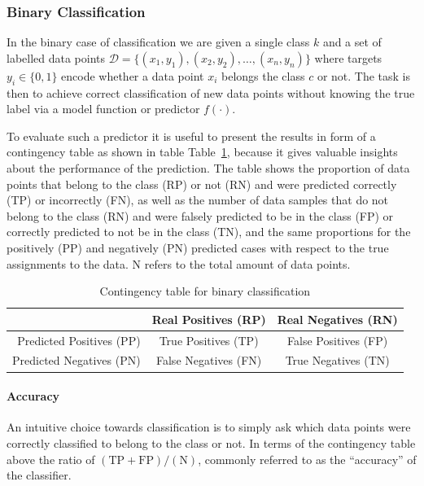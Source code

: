 \subsubsection*{Binary Classification}
\label{subs:Binary Classification}

In the binary case of classification we are given a single class $k$ and a set of labelled data points $\mathcal{D} = \{ (x_1, y_1), (x_2, y_2), \ldots, (x_n, y_n) \}$ where targets $y_i \in \{0, 1\}$ encode whether a data point $x_i$ belongs the class $c$ or not. The task is then to achieve correct classification of new data points without knowing the true label via a model function or predictor $f(\cdot)$.

To evaluate such a predictor it is useful to present the results in form of a contingency table as shown in table Table~\ref{table:contingency-table-2}, because it gives valuable insights about the performance of the prediction. The table shows the proportion of data points that belong to the class (RP) or not (RN) and were predicted correctly (TP) or incorrectly (FN), as well as the number of data samples that do not belong to the class (RN) and were falsely predicted to be in the class (FP) or correctly predicted to not be in the class (TN), and the same proportions for the positively (PP) and negatively (PN) predicted cases with respect to the true assignments to the data. N refers to the total amount of data points.

\begin{table}[h]
  \begin{center}
    \begin{tabular}{r | c c }
      & Real Positives (RP) & Real Negatives (RN) \\
      \hline
      Predicted Positives (PP) & True Positives (TP) & False Positives (FP) \\
      Predicted Negatives (PN) & False Negatives (FN) & True Negatives (TN) \\
    \end{tabular}
  \caption{Contingency table for binary classification}
\label{table:contingency-table-2}
  \end{center}
\end{table}

\paragraph{Accuracy}
\label{par:Accuracy}

An intuitive choice towards classification is to simply ask which data points were correctly classified to belong to the class or not. In terms of the contingency table above the ratio of $(\text{TP} + \text{FP}) / (\text{N})$, commonly referred to as the ``accuracy'' of the classifier.

